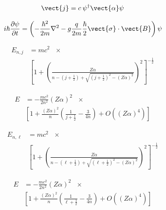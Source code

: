 \begin{equation}
\vect{j} = c \: \psi^{\dagger} \vect{\alpha} \psi
\end{equation}

\begin{equation}
i \hbar \frac{\partial \psi}{\partial t} =
\left (-\frac{\hbar^2}{2m} \nabla^2
  - g \frac{q}{2m} \frac{\hbar}{2} \vect{\sigma}\cdot \vect{B} \right)
  \psi
\end{equation}

\begin{align}
  E_{n,j} & = mc^2 \:\:\: \times \nonumber \\
    & \left[1 +
    \left(
    \frac{Z\alpha}{
      n - (j+\frac{1}{2}) + \sqrt{(j+\frac{1}{2})^2 - (Z\alpha)^2}
      }
    \right)^2
    \right]^{-\frac{1}{2}}
\end{align}

\begin{align}
  E & = - \frac{mc^2}{2n^2} (Z\alpha)^2 \:\:\: \times \nonumber \\
  & \left[ 1 + \frac{(Z\alpha)^2}{n}
  \left( \frac{1}{j+\frac{1}{2}} - \frac{3}{4n}
  \right)
  +O((Z\alpha)^4) \right]
\end{align}


\begin{align}
  E_{n,\ell} & = mc^2 \:\:\: \times \nonumber \\
    & \left[1 +
    \left(
    \frac{Z\alpha}{
      n - (\ell+\frac{1}{2}) + \sqrt{(\ell+\frac{1}{2})^2 - (Z\alpha)^2}
      }
    \right)^2
    \right]^{-\frac{1}{2}}
\end{align}

\begin{align}
  E & = - \frac{mc^2}{2n^2} (Z\alpha)^2 \:\:\: \times \nonumber \\
  & \left[ 1 + \frac{(Z\alpha)^2}{n}
  \left( \frac{1}{\ell+\frac{1}{2}} - \frac{3}{4n}
  \right)
  +O((Z\alpha)^4) \right]
\end{align}
